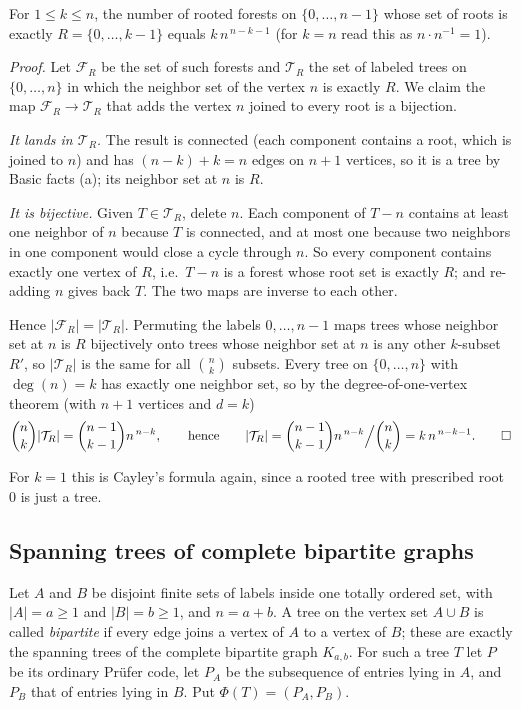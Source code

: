 \documentclass[11pt]{article}
\begin{document}
\begin{theorembox}
For $1\le k\le n$, the number of rooted forests on $\{0,\dots,n-1\}$ whose
set of roots is exactly $R=\{0,\dots,k-1\}$ equals $k\,n^{\,n-k-1}$ (for
$k=n$ read this as $n\cdot n^{-1}=1$).

\emph{Proof.} Let $\mathcal F_R$ be the set of such forests and
$\mathcal T_R$ the set of labeled trees on $\{0,\dots,n\}$ in which the
neighbor set of the vertex $n$ is exactly $R$. We claim the map
$\mathcal F_R\to\mathcal T_R$ that adds the vertex $n$ joined to every
root is a bijection.

\emph{It lands in $\mathcal T_R$.} The result is connected (each
component contains a root, which is joined to $n$) and has
$(n-k)+k=n$ edges on $n+1$ vertices, so it is a tree by Basic facts (a);
its neighbor set at $n$ is $R$.

\emph{It is bijective.} Given $T\in\mathcal T_R$, delete $n$. Each
component of $T-n$ contains at least one neighbor of $n$ because $T$ is
connected, and at most one because two neighbors in one component would
close a cycle through $n$. So every component contains exactly one vertex
of $R$, i.e.\ $T-n$ is a forest whose root set is exactly $R$; and
re-adding $n$ gives back $T$. The two maps are inverse to each other.

Hence $|\mathcal F_R|=|\mathcal T_R|$. Permuting the labels
$0,\dots,n-1$ maps trees whose neighbor set at $n$ is $R$ bijectively onto
trees whose neighbor set at $n$ is any other $k$-subset $R'$, so
$|\mathcal T_R|$ is the same for all $\binom nk$ subsets. Every tree on
$\{0,\dots,n\}$ with $\deg(n)=k$ has exactly one neighbor set, so by the
degree-of-one-vertex theorem (with $n+1$ vertices and $d=k$)
\[
  \binom nk|\mathcal T_R|=\binom{n-1}{k-1}n^{\,n-k},
  \qquad\text{hence}\qquad
  |\mathcal T_R|=\binom{n-1}{k-1}n^{\,n-k}\Big/\binom nk=k\,n^{\,n-k-1}. \qed
\]
\end{theorembox}

For $k=1$ this is Cayley's formula again, since a rooted tree with
prescribed root $0$ is just a tree.

\subsection{Spanning trees of complete bipartite graphs}
Let $A$ and $B$ be disjoint finite sets of labels inside one totally
ordered set, with $|A|=a\ge1$ and $|B|=b\ge1$, and $n=a+b$. A tree on
the vertex set $A\cup B$ is called \emph{bipartite} if every edge joins a
vertex of $A$ to a vertex of $B$; these are exactly the spanning trees of
the complete bipartite graph $K_{a,b}$. For such a tree $T$ let $P$ be its
ordinary Pr\"ufer code, let $P_A$ be the subsequence of entries lying in
$A$, and $P_B$ that of entries lying in $B$. Put $\Phi(T)=(P_A,P_B)$.
\end{document}
